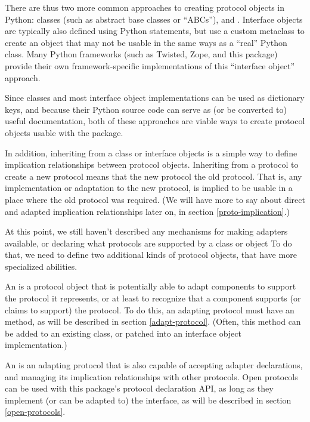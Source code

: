 There are thus two more common approaches to creating protocol objects in
Python: classes (such as abstract base classes or ``ABCs''), and .  Interface objects are typically also defined using Python
 statements, but use a custom metaclass to create an object
that may not be usable in the same ways as a ``real'' Python class.  Many
Python frameworks (such as Twisted, Zope, and this package) provide their own
framework-specific implementations of this ``interface object'' approach.

Since classes and most interface object implementations can be used as
dictionary keys, and because their Python source code can serve as (or
be converted to) useful documentation, both of these approaches are viable
ways to create protocol objects usable with the  package.

In addition, inheriting from a class or interface objects is a simple way to
define implication relationships between protocol objects.  Inheriting from a
protocol to create a new protocol means that the new protocol 
the old protocol.  That is, any implementation or adaptation to the new
protocol, is implied to be usable in a place where the old protocol was
required.  (We will have more to say about direct and adapted implication
relationships later on, in section \ref{proto-implication}.)

At this point, we still haven't described any mechanisms for making adapters
available, or declaring what protocols are supported by a class or object
To do that, we need to define two additional kinds of protocol objects, that
have more specialized abilities.

An  is a protocol object that is potentially able to
adapt components to support the protocol it represents, or at least to
recognize that a component supports (or claims to support) the protocol.  To
do this, an adapting protocol must have an  method, as
will be described in section \ref{adapt-protocol}.  (Often, this method
can be added to an existing class, or patched into an interface object
implementation.)

An  is an adapting protocol that is also capable of
accepting adapter declarations, and managing its implication relationships
with other protocols.  Open protocols can be used with this package's
protocol declaration API, as long as they implement (or can be adapted to)
the  interface, as will be described in section
\ref{open-protocols}.

